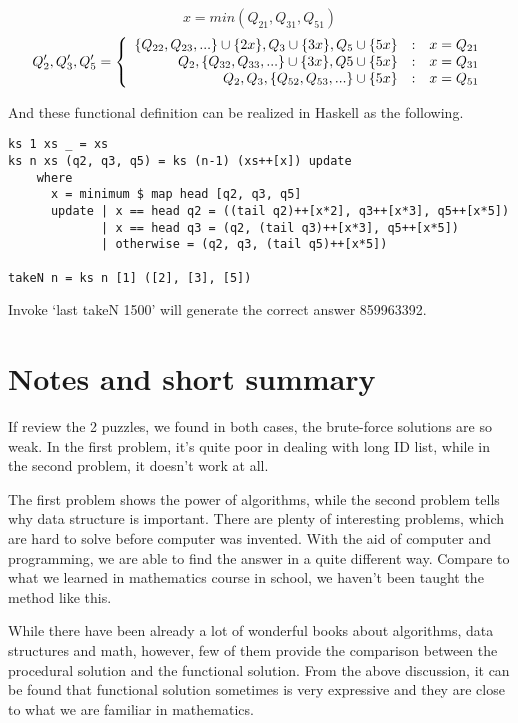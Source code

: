 \documentclass{article}
\begin{document}
\[
 x = min(Q_{21}, Q_{31}, Q_{51})
\]
\[
 Q_2', Q_3', Q_5' = \left \{
 \begin{array}{r@{\quad:\quad}l}
 \{Q_{22}, Q_{23}, ...\} \cup \{2x\}, Q_3 \cup \{3x\}, Q_5 \cup \{5x\} & x = Q_{21} \\
 Q_2, \{Q_{32}, Q_{33}, ...\} \cup \{3x\}, Q5 \cup \{5x\} & x = Q_{31} \\
 Q_2, Q_3, \{Q_{52}, Q_{53}, ...\} \cup \{5x\} & x = Q_{51}
 \end{array}
 \right.
\]

And these functional definition can be realized in Haskell as the following.

\lstset{language=Haskell}
\begin{lstlisting}
ks 1 xs _ = xs
ks n xs (q2, q3, q5) = ks (n-1) (xs++[x]) update
    where
      x = minimum $ map head [q2, q3, q5]
      update | x == head q2 = ((tail q2)++[x*2], q3++[x*3], q5++[x*5])
             | x == head q3 = (q2, (tail q3)++[x*3], q5++[x*5])
             | otherwise = (q2, q3, (tail q5)++[x*5])

takeN n = ks n [1] ([2], [3], [5])
\end{lstlisting} %

Invoke `last takeN 1500' will generate the correct answer 859963392.

\section{Notes and short summary}
If review the 2 puzzles, we found in both cases, the brute-force solutions
are so weak. In the first problem, it's quite poor in dealing with
long ID list, while in the second problem, it doesn't work at all.

The first problem shows the power of algorithms, while the second
problem tells why data structure is important. There are plenty
of interesting problems, which are hard to solve before computer
was invented. With the aid of computer and programming, we are able
to find the answer in a quite different way. Compare to what we
learned in mathematics course in school, we haven't been taught the method
like this.

While there have been already a lot of wonderful books about
algorithms, data structures and math, however, few of them
provide the comparison between the procedural solution and
the functional solution. From the above discussion, it can be
found that functional solution sometimes is very expressive
and they are close to what we are familiar in mathematics.
\end{document}

